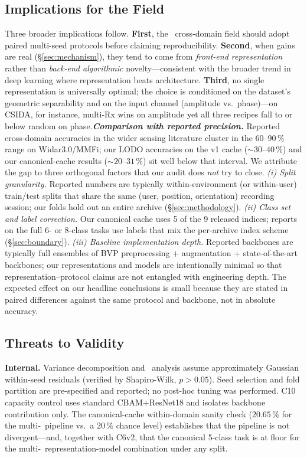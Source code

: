 \documentclass[journal,11pt]{IEEEtran}
\newcommand{\CSI}{\text{CSI}}
\newcommand{\MDE}{\text{MDE}}
\newcommand{\LODO}{\text{LODO}}
\newcommand{\Rx}{\text{Rx}}
\begin{document}
\subsection{Implications for the Field}
Three broader implications follow. \textbf{First}, the \CSI\ cross-domain field should adopt paired multi-seed protocols before claiming reproducibility. \textbf{Second}, when gains are real (\S\ref{sec:mechanism}), they tend to come from \emph{front-end representation} rather than \emph{back-end algorithmic} novelty---consistent with the broader trend in deep learning where representation beats architecture. \textbf{Third}, no single representation is universally optimal; the choice is conditioned on the dataset's geometric separability and on the input channel (amplitude vs.\ phase)---on CSIDA, for instance, multi-Rx wins on amplitude yet all three recipes fall to or below random on phase.\textbf{\emph{Comparison with reported precision.}} Reported cross-domain accuracies in the wider \CSI{} sensing literature cluster in the $60$--$90\,\%$ range on Widar3.0/MMFi; our LODO accuracies on the v1 cache ($\sim 30$--$40\,\%$) and our canonical-cache results ($\sim 20$--$31\,\%$) sit well below that interval. We attribute the gap to three orthogonal factors that our audit does \emph{not} try to close. \emph{(i) Split granularity.} Reported numbers are typically within-environment (or within-user) train/test splits that share the same (user, position, orientation) recording session; our \LODO{} folds hold out an entire archive (\S\ref{sec:methodology}). \emph{(ii) Class set and label correction.} Our canonical cache uses 5 of the 9 released indices; reports on the full 6- or 8-class tasks use labels that mix the per-archive index scheme (\S\ref{sec:boundary}). \emph{(iii) Baseline implementation depth.} Reported backbones are typically full ensembles of BVP preprocessing + augmentation + state-of-the-art backbones; our representations and models are intentionally minimal so that representation--protocol claims are not entangled with engineering depth. The expected effect on our headline conclusions is small because they are stated in paired differences against the same protocol and backbone, not in absolute accuracy.

\subsection{Threats to Validity}
\textbf{Internal.} Variance decomposition and \MDE\ analysis assume approximately Gaussian within-seed residuals (verified by Shapiro-Wilk, $p > 0.05$). Seed selection and fold partition are pre-specified and reported; no post-hoc tuning was performed. C10 capacity control uses standard CBAM+ResNet18 and isolates backbone contribution only. The canonical-cache within-domain sanity check ($20.65\,\%$ for the multi-\Rx\ pipeline vs.\ a $20\,\%$ chance level) establishes that the pipeline is not divergent---and, together with C6v2, that the canonical 5-class task is at floor for the multi-\Rx\ representation-model combination under any split.
\end{document}
